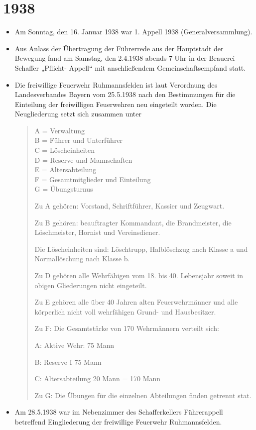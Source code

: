 \documentclass[12pt,a4paper]{book}
\begin{document}
\section*{1938}

\begin{itemize}
\item Am Sonntag, den 16. Januar 1938 war 1. Appell 1938 (Generalversammlung).

\item Aus Anlass der Übertragung der Führerrede aus der Hauptstadt der Bewegung
fand am Samstag, den 2.4.1938 abends 7 Uhr in der Brauerei Schaffer „Pflicht-
Appell“ mit anschließendem Gemeinschaftsempfand statt.

\item Die freiwillige Feuerwehr Ruhmannsfelden ist laut Verordnung des
Landesverbandes Bayern vom 25.5.1938 nach den Bestimmungen für die Einteilung
der freiwilligen Feuerwehren neu eingeteilt worden. Die Neugliederung setzt sich
zusammen unter

\begin{quote}
A = Verwaltung\\
B = Führer und Unterführer\\
C = Löscheinheiten\\
D = Reserve und Mannschaften\\
E = Altersabteilung\\
F = Gesamtmitglieder und Einteilung\\
G = Übungsturnus

Zu A gehören: Vorstand, Schriftführer, Kassier und Zeugwart.

Zu B gehören: beauftragter Kommandant, die Brandmeister, die Löschmeister,
Hornist und Vereinsdiener.

Die Löscheinheiten sind: Löschtrupp, Halblöschzug nach Klasse a und
Normallöschung nach Klasse b.

Zu D gehören alle Wehrfähigen vom 18. bis 40. Lebensjahr soweit in obigen
Gliederungen nicht eingeteilt.

Zu E gehören alle über 40 Jahren alten Feuerwehrmänner und alle körperlich nicht
voll wehrfähigen Grund- und Hausbesitzer.

Zu F: Die Gesamtstärke von 170 Wehrmännern verteilt sich:

A: Aktive Wehr: 75 Mann

B: Reserve I 75 Mann

C: Altersabteilung 20 Mann = 170 Mann

Zu G: Die Übungen für die einzelnen Abteilungen finden getrennt stat.
\end{quote}

\item Am 28.5.1938 war im Nebenzimmer des Schafferkellers Führerappell
betreffend Eingliederung der freiwillige Feuerwehr Ruhmannsfelden.
\end{itemize}
\end{document}

